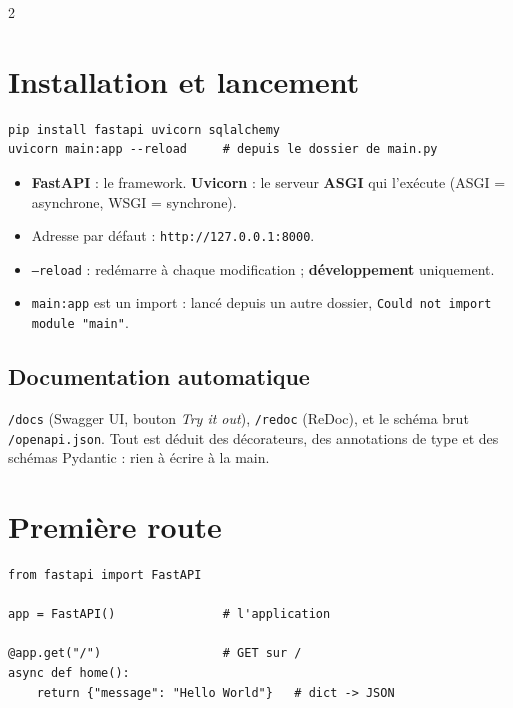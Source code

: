 \documentclass[a4paper,10pt]{article}
\newcommand{\co}[1]{\texttt{\textcolor{codefg}{#1}}}
\begin{document}
\vspace{0.5em}
\begin{multicols}{2}

\section{Installation et lancement}

\begin{lstlisting}
pip install fastapi uvicorn sqlalchemy
uvicorn main:app --reload     # depuis le dossier de main.py
\end{lstlisting}

\begin{itemize}
  \item \textbf{FastAPI} : le framework. \textbf{Uvicorn} : le serveur
        \textbf{ASGI} qui l'exécute (ASGI = asynchrone, WSGI = synchrone).
  \item Adresse par défaut : \co{http://127.0.0.1:8000}.
  \item \co{--reload} : redémarre à chaque modification ; \textbf{développement}
        uniquement.
  \item \co{main:app} est un import : lancé depuis un autre dossier,
        \co{Could not import module "main"}.
\end{itemize}

\subsection{Documentation automatique}
\co{/docs} (Swagger UI, bouton \emph{Try it out}), \co{/redoc} (ReDoc), et
le schéma brut \co{/openapi.json}. Tout est déduit des décorateurs, des
annotations de type et des schémas Pydantic : rien à écrire à la main.

\section{Première route}

\begin{lstlisting}
from fastapi import FastAPI

app = FastAPI()               # l'application

@app.get("/")                 # GET sur /
async def home():
    return {"message": "Hello World"}   # dict -> JSON
\end{lstlisting}


\end{multicols}
\end{document}
